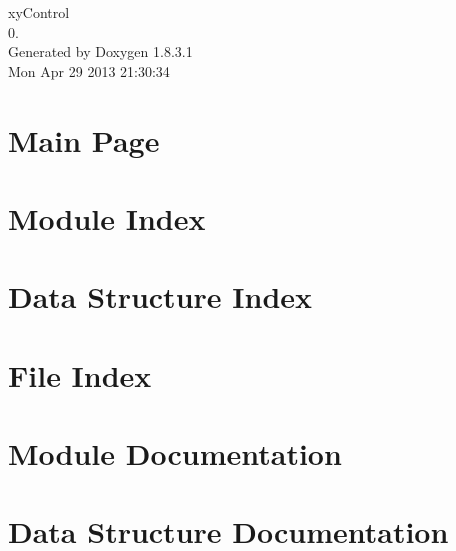 \documentclass{book}
\begin{document}
\hypersetup{pageanchor=false,citecolor=blue}
\begin{titlepage}
\vspace*{7cm}
\begin{center}
{\Large xy\-Control \\[1ex]\large 0. }\\
\vspace*{1cm}
{\large Generated by Doxygen 1.8.3.1}\\
\vspace*{0.5cm}
{\small Mon Apr 29 2013 21:30:34}\\
\end{center}
\end{titlepage}
\clearemptydoublepage
{}
\tableofcontents
\clearemptydoublepage
{}
\hypersetup{pageanchor=true,citecolor=blue}
\chapter{Main Page}
\label{index}\hypertarget{index}{}
\chapter{Module Index}

\chapter{Data Structure Index}

\chapter{File Index}

\chapter{Module Documentation}

























\chapter{Data Structure Documentation}








\end{document}
